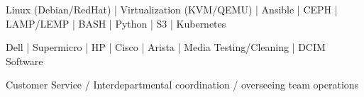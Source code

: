 
\begin{cvskills}

	\cvskill
	{}{Linux (Debian/RedHat) | Virtualization (KVM/QEMU) | Ansible | CEPH | LAMP/LEMP | BASH | Python | S3 | Kubernetes}

	\cvskill
	{}{Dell | Supermicro | HP | Cisco | Arista | Media Testing/Cleaning | DCIM Software}

	\cvskill
	{}{Customer Service / Interdepartmental coordination / overseeing team operations}

\end{cvskills}


